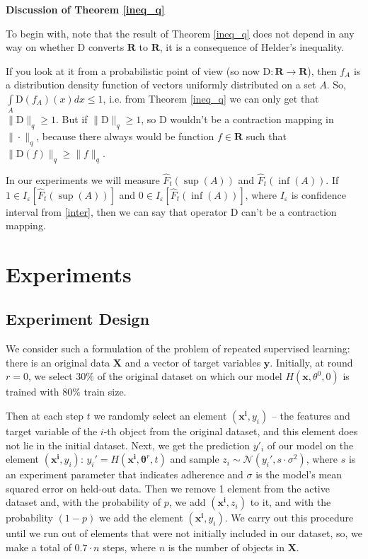 \documentclass{article}
\begin{document}
    \textbf{Discussion of Theorem \ref{ineq_q}}

    To begin with, note that the result of Theorem \ref{ineq_q} does not depend in any way on whether $\text{D}$ converts $\mathbf{R}$ to $\mathbf{R}$, it is a consequence of Helder's inequality. 
    
    If you look at it from a probabilistic point of view (so now $\text{D} : \mathbf{R} \to \mathbf{R}$), then $f_A$ is a distribution density function of vectors uniformly distributed on a set $A$. So, $\int\limits_{A} \text{D}(f_A)(x)dx \leq 1$, i.e. from Theorem \ref{ineq_q} we can only get that $\|\text{D}\|_q \geq 1$. But if $\|\text{D}\|_q \geq 1$, so $\text{D}$ wouldn't be a contraction mapping in $\|\cdot\|_q$, because there always would be function $f \in \mathbf{R}$ such that $\|\text{D}(f)\|_q \geq \|f\|_q$.

    In our experiments we will measure $\hat{F}_t(\sup(A))$ and $\hat{F}_t(\inf(A))$. If $1 \in I_{\varepsilon}[\hat{F}_t(\sup(A))]$ and $0 \in I_{\varepsilon}[\hat{F}_t(\inf(A))]$, where $I_{\varepsilon}$ is confidence interval from \eqref{inter}, then we can say that operator $\text{D}$ can't be a contraction mapping.

\section{Experiments} \label{Experiments}

    \subsection{Experiment Design} \label{design}
        We consider \footnotemark such a formulation of the problem of repeated supervised learning: there is an original data $\textbf{X}$ and a vector of target variables $\mathbf{y}$. Initially, at round $r = 0$, we select $30\%$ of the original dataset on which our model $H(\mathbf{x}, \theta^0, 0)$ is trained with $80\%$ train size. 

        
        Then at each step $t$ we randomly select an element $(\mathbf{x^i}, y_i)$ -- the features and target variable of the $i$-th object from the original dataset, and this element does not lie in the initial dataset. Next, we get the prediction $y'_i$ of our model on the element $(\mathbf{x^i}, y_i)$: $y_i'=H(\mathbf{x^i}, \mathbf{\theta}^r, t)$ and sample $z_i \sim \mathcal{N}(y_i', s \cdot \sigma^2)$, where $s$ is an experiment parameter that indicates adherence and $\sigma$ is the model's mean squared error on held-out data. Then we remove 1 element from the active dataset and, with the probability of $p$, we add $(\mathbf{x^i}, z_i)$ to it, and with the probability $(1-p)$ we add the element $(\mathbf{x^i}, y_i)$. We carry out this procedure until we run out of elements that were not initially included in our dataset, so, we make a total of $0.7 \cdot n$ steps, where $n$ is the number of objects in $\textbf{X}$.
\end{document}
